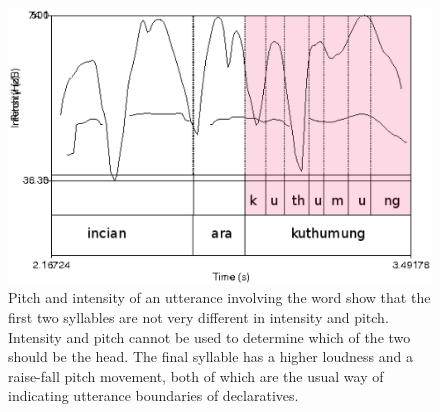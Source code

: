\begin{figure}
 \centering
\includegraphics{pics/kuthumungintenspitch.eps}
 \caption[Absence of pitch and intensity cues for stress in the word ]{Pitch and intensity of an utterance involving the word  show that the first two syllables are not very different in intensity and pitch. Intensity and pitch cannot be used to determine which of the two should be the head. The final syllable has a higher loudness and a raise-fall pitch movement, both of which are the usual way of indicating utterance boundaries of declaratives.}
\label{fig:kuthumungintenspitch}
\end{figure}



